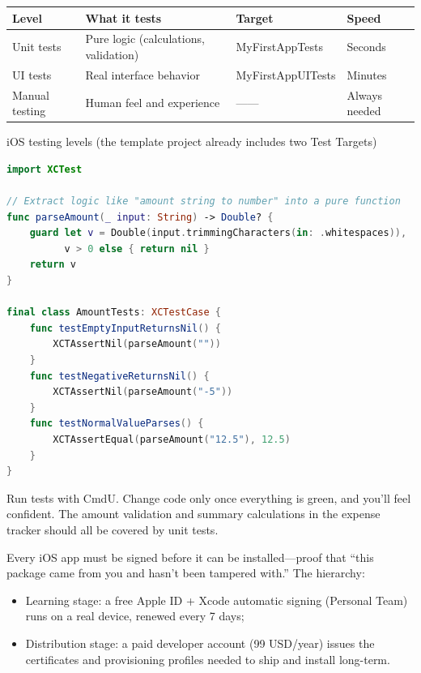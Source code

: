 \begin{center}
\begin{tabularx}{\linewidth}{|X|X|X|X|}
\hline
\textbf{Level} & \textbf{What it tests} & \textbf{Target} & \textbf{Speed} \tabularnewline
\hline
Unit tests & Pure logic (calculations, validation) & MyFirstAppTests & Seconds \tabularnewline
UI tests & Real interface behavior & MyFirstAppUITests & Minutes \tabularnewline
Manual testing & Human feel and experience & —— & Always needed \tabularnewline
\hline
\end{tabularx}
\end{center}

\begin{center}\small\color{gray}iOS testing levels (the template project already includes two Test Targets)\end{center}

\begin{lstlisting}[language=Swift]
import XCTest

// Extract logic like "amount string to number" into a pure function
func parseAmount(_ input: String) -> Double? {
    guard let v = Double(input.trimmingCharacters(in: .whitespaces)),
          v > 0 else { return nil }
    return v
}

final class AmountTests: XCTestCase {
    func testEmptyInputReturnsNil() {
        XCTAssertNil(parseAmount(""))
    }
    func testNegativeReturnsNil() {
        XCTAssertNil(parseAmount("-5"))
    }
    func testNormalValueParses() {
        XCTAssertEqual(parseAmount("12.5"), 12.5)
    }
}
\end{lstlisting}

Run tests with CmdU. Change code only once everything is green, and you'll feel confident. The amount validation and summary calculations in the expense tracker should all be covered by unit tests.


Every iOS app must be signed before it can be installed—proof that “this package came from you and hasn't been tampered with.” The hierarchy:

\begin{itemize}
  \item Learning stage: a free Apple ID + Xcode automatic signing (Personal Team) runs on a real device, renewed every 7 days;
  \item Distribution stage: a paid developer account (99 USD/year) issues the certificates and provisioning profiles needed to ship and install long-term.
\end{itemize}

